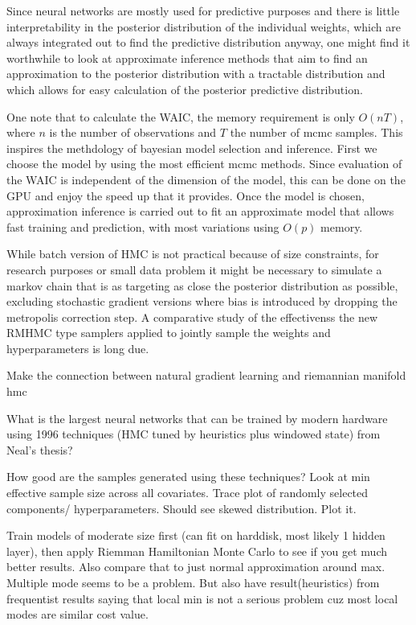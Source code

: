 \documentclass{book}
\begin{document}
\begin{enumerate}
Since neural networks are 
mostly used for predictive purposes and there is little interpretability in the
posterior distribution of the individual weights, which are
always integrated out to find the predictive distribution anyway, one might find
it worthwhile to look at approximate inference methods that aim to find
an approximation to the posterior distribution with a tractable distribution and
which allows for easy calculation of the posterior predictive distribution. 

One note that to calculate the WAIC, the memory requirement is only $O(nT)$,
where $n$ is the number of observations and $T$ the number of mcmc samples. This
inspires the methdology of bayesian model selection and inference. First we
choose the model by using the most efficient mcmc methods. Since evaluation of
the WAIC is independent of the dimension of the model, this can be done on the
GPU and enjoy the speed up that it provides. Once the model is chosen,
approximation inference is carried out to fit an approximate model that allows
fast training and prediction, with most variations using $O(p)$ memory.

While batch version of HMC is not practical because of size constraints, for
research purposes or small data problem it might be necessary to simulate a
markov chain that is as targeting as close the posterior distribution as
possible, excluding stochastic gradient versions where bias is introduced by
dropping the metropolis correction step. A comparative study of the effectivenss the new
RMHMC type samplers applied to jointly sample the weights and hyperparameters is
long due. 

Make the connection between natural gradient learning and riemannian manifold
hmc



What is the largest neural networks that can be trained by modern hardware using 1996 techniques (HMC tuned by heuristics plus windowed state) from Neal's thesis?  

How good are the samples generated using these techniques? Look at min effective sample size across all covariates. Trace plot of randomly selected components/ hyperparameters. Should see skewed distribution. Plot it.


Train models of moderate size first (can fit on harddisk, most likely 1 hidden layer), then apply Riemman Hamiltonian Monte Carlo to see if you get much better results. Also compare that to just normal approximation around max. Multiple mode seems to be a problem. But also have result(heuristics) from frequentist results saying that local min is not a serious problem cuz most local modes are similar cost value. 


\end{enumerate}
\end{document}
